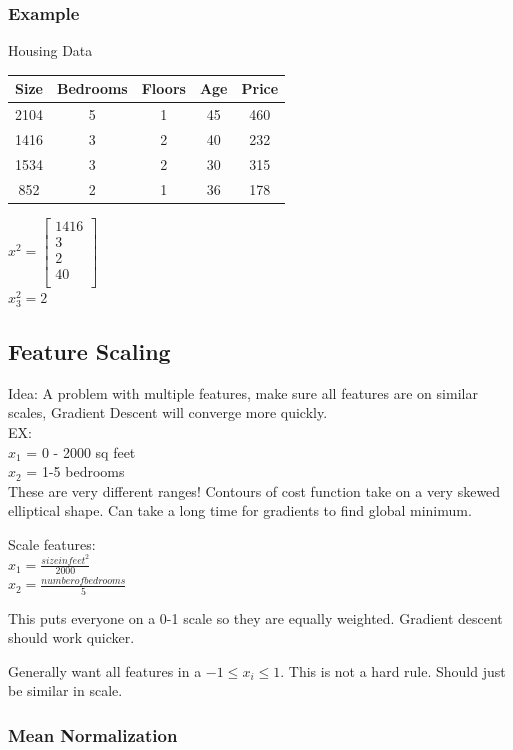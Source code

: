 \subsubsection{Example}

Housing Data\\
\begin{tabular}{|c|c|c|c|c|}
  \hline
  Size & Bedrooms & Floors & Age & Price \\ \hline
  2104 & 5 & 1 & 45 & 460 \\ \hline
  1416 & 3 & 2 & 40 & 232 \\ \hline
  1534 & 3 & 2 & 30 & 315 \\ \hline
  852  & 2 & 1 & 36 & 178 \\ \hline
\end{tabular}
$
x^{2} = \begin{bmatrix}
  1416 \\
  3 \\
  2   \\ 
  40 \\
\end{bmatrix}
$ \\
$x_{3}^{2} = 2$

\subsection{Feature Scaling}

Idea: A problem with multiple features, make sure all features are on similar scales, Gradient Descent will converge more quickly.\\
EX:\\
$x_{1} $ = 0 - 2000 sq feet\\
$x_{2}$ = 1-5 bedrooms \\

These are very different ranges!  Contours of cost function take on a very skewed elliptical shape.  Can take a long time for gradients to find global minimum.

Scale features:\\
$x_{1} = \frac{size in feet^{2}}{2000}$\\
$x_{2} = \frac{number of bedrooms}{5}$

This puts everyone on a 0-1 scale so they are equally weighted.  Gradient descent should work quicker.

Generally want all features in a $-1 \leq x_{i} \leq 1$.  This is not a hard rule.  Should just be similar in scale.

\subsubsection{Mean Normalization}

